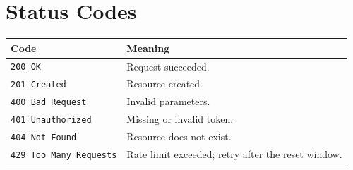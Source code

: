\section{Status Codes}

\begin{tabularx}{\linewidth}{@{}l X@{}}
\toprule
\textbf{Code} & \textbf{Meaning}\\
\midrule
\texttt{200 OK}          & Request succeeded.\\
\texttt{201 Created}     & Resource created.\\
\texttt{400 Bad Request} & Invalid parameters.\\
\texttt{401 Unauthorized}& Missing or invalid token.\\
\texttt{404 Not Found}   & Resource does not exist.\\
\texttt{429 Too Many Requests} & Rate limit exceeded; retry after the reset window.\\
\bottomrule
\end{tabularx}
